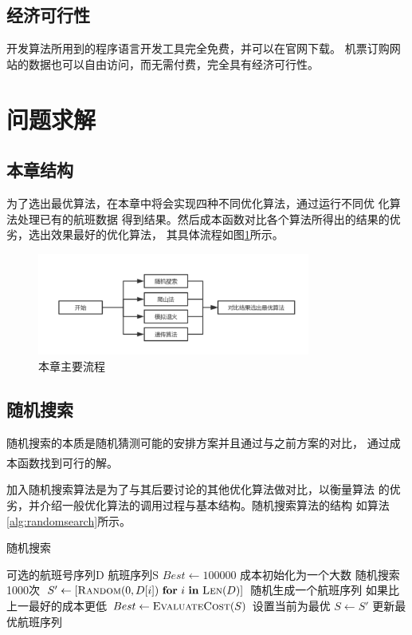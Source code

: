 \documentclass[fontset=fandol,a4paper,zihao=5]{ctexart}
\newcommand{\upcite}[1]{\textsuperscript{\textsuperscript{\cite{#1}}}}
\begin{document}
		\subsection{经济可行性}
			开发算法所用到的程序语言开发工具完全免费，并可以在官网下载。
            机票订购网站的数据也可以自由访问，而无需付费，完全具有经济可行性。
	\section{问题求解}
	\label{sec:solve}
		\subsection{本章结构}
			为了选出最优算法，在本章中将会实现四种不同优化算法，通过运行不同优
            化算法处理已有的航班数据
            得到结果。然后成本函数对比各个算法所得出的结果的优劣，选出效果最好的优化算法，
            其具体流程如图\ref{fig:flow}所示。
			\begin{figure}[!h]
				\centering
				\includegraphics[width=0.8\textwidth]{pic/flow.pdf}
				\caption{\label{fig:flow}本章主要流程}
			\end{figure}
		\subsection{随机搜索}
		\label{sec:random}
			随机搜索的本质是随机猜测可能的安排方案并且通过与之前方案的对比，
            通过成本函数找到可行的解\upcite{贺红2002随机算法的一般性原理}。
			
			加入随机搜索算法是为了与其后要讨论的其他优化算法做对比，以衡量算法
            的优劣，并介绍一般优化算法的调用过程与基本结构。随机搜索算法的结构
            如算法\ref{alg:randomsearch}所示。
			\begin{algorithm}
				\begin{algorithmic}
					\caption{\label{alg:randomsearch}随机搜索}
					\Require $\text{可选的航班号序列D}$
					\Ensure $\text{航班序列S}$
					\State $Best \gets 100000$ \Comment 成本初始化为一个大数
					  \Comment 随机搜索1000次
						\State $S' \gets [ \Call{Random}{0,D[i]}\ \textbf{for}\ i\ \textbf{in}\ \Call{Len}{D}]$ \Comment 随机生成一个航班序列
						 \Comment 如果比上一最好的成本更低
							\State $Best \gets \Call{EvaluateCost}{S}$ \Comment 设置当前为最优
							\State $S \gets S'$ \Comment 更新最优航班序列
						\EndIf
					\EndFor
					\State {}
					\EndFunction
				\end{algorithmic}
			\end{algorithm}
		
\end{document}
